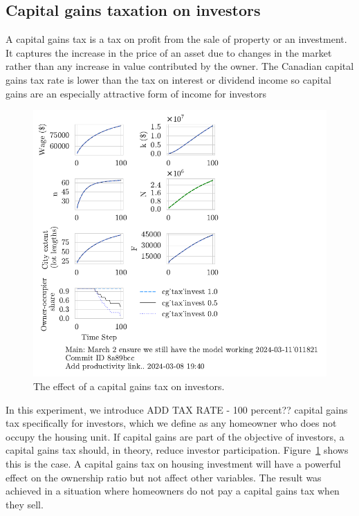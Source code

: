\subsection{Capital gains taxation on investors}
A \gls{capital gains} tax is a tax on profit from the sale of property or an investment. It captures the increase in the price of an asset due to changes in the market rather than any increase in value contributed by the owner. The Canadian capital gains tax rate is lower than the tax on interest or dividend income so capital gains are an especially attractive form of income for investors
\begin{figure}[!hbtp]
    \centering
    \includegraphics[scale=1.1, trim={0 1.4cm 4cm 0},clip]{fig/cg_tax_invest-Main-011821.pdf}
    \caption{The effect of a capital gains tax on investors.}
    \label{fig:CGinvest_ownership_trajectory}
\end{figure}


In this experiment, we introduce {\color{red} ADD TAX RATE  - 100 percent?? } capital gains tax specifically for investors, which we define as any homeowner who does not occupy the housing unit. If capital gains are part of the objective of investors, a capital gains tax should, in theory, reduce investor participation. Figure~\ref{fig:CGinvest_ownership_trajectory} shows this is the case. A capital gains tax on housing investment will have a powerful effect on the ownership ratio but not affect other variables. The result was achieved in a situation where homeowners do not pay a capital gains tax when they sell. 


